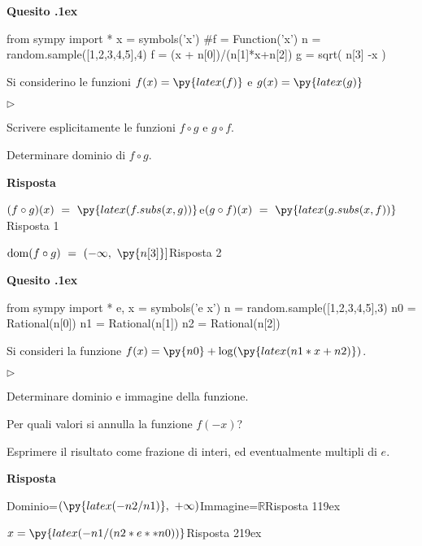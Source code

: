 \documentclass[11pt,twoside,a4paper]{article}
\newcommand{\mylabel}[1]{#1\hfill}
\renewenvironment{itemize}
  {\begin{list}{$\triangleright$}{%
   \setlength{\parskip}{0mm}
   \setlength{\topsep}{.4\baselineskip}
   \setlength{\rightmargin}{0mm}
   \setlength{\listparindent}{0mm}
   \setlength{\itemindent}{0mm}
   \setlength{\labelwidth}{2ex}
   \setlength{\itemsep}{.4\baselineskip}
   \setlength{\parsep}{0mm}
   \setlength{\partopsep}{0mm}
   \setlength{\labelsep}{1ex}
   \setlength{\leftmargin}{\labelwidth+\labelsep}
   \let\makelabel\mylabel}}{%
   \end{list}\vspace*{-1.3mm}}
\newcounter{quesito}
\newenvironment{question}{\bigskip\addtocounter{quesito}{1}\bigskip\bigskip\par\textbf{Quesito \thequesito.\kern1ex}}{\vspace{\parskip}}
\newenvironment{answer}{\par\textbf{Risposta\quad}}{\vspace{\parskip}}
\begin{document}
\begin{question}
\def\dom{{\rm dom}}
\def\range{{\rm im}}
\begin{pycode}
from sympy import *
x = symbols('x')
#f = Function('x')
n = random.sample([1,2,3,4,5],4)
f = (x + n[0])/(n[1]*x+n[2])
g = sqrt( n[3] -x )
\end{pycode}
Si considerino le funzioni $\displaystyle f(x) = \py{latex(f)}$ e $\displaystyle g(x) =\py{latex(g)}$
\begin{itemize}
\item[1.] Scrivere esplicitamente le funzioni $f \circ g$ e $g \circ f$.
\item[2.] Determinare dominio di $f \circ g$.
\end{itemize}
\begin{answer}

{\color{blue}$\displaystyle (f \circ g) (x)\ =\ \py{latex(f.subs(x,g))}$\qquad e\qquad $\displaystyle (g \circ f) (x)\ =\ \py{latex(g.subs(x,f))}$\hfill Risposta 1}

\smallskip
{\color{blue}$\dom (f \circ g)\ =\ (-\infty,\ \py{n[3]}]$\hfill Risposta 2}

\end{answer}
\end{question}

\begin{question}
\def\RR{{\mathds R}}
\begin{pycode}
from sympy import *
e, x = symbols('e x')
n = random.sample([1,2,3,4,5],3)
n0 = Rational(n[0])
n1 = Rational(n[1])
n2 = Rational(n[2])
\end{pycode}
Si consideri la funzione $f(x) = \py{n0} + \log(\py{ latex( n1*x+n2 ) } )$.
\begin{itemize}
\item[1.] Determinare dominio e immagine della funzione. 
\item[2.] Per quali valori si annulla la funzione $f(-x)$?
\end{itemize}
Esprimere il risultato come frazione di interi, ed eventualmente multipli di $e$.
\begin{answer}

\end{answer}

{\color{blue} Dominio=$\displaystyle\left(\py{latex(-n2/n1)},\ +\infty\right)$\qquad Immagine=$\RR$\hfill Risposta 1\kern19ex}

{\color{blue}$\displaystyle x=\py{latex(-n1/(n2*e**n0))}$\hfill Risposta 2\kern19ex}

\end{question}
\end{document}
